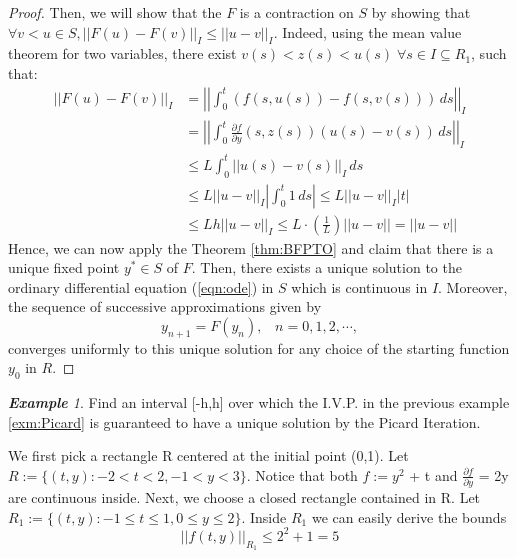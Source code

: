 \documentclass{article}
\theoremstyle{definition}
\theoremstyle{remark}
\theoremstyle{example}
\newtheorem{example}{\textbf{Example}}[section]
\begin{document}
\begin{proof}
    Then, we will show that the $F$ is a contraction on $S$ by showing that $\forall v < u \in S, \lvert\lvert F(u) - F(v) \rvert\rvert_I \leq \lvert\lvert u - v \rvert\rvert_I$. Indeed, using the mean value theorem for two variables, there exist $v(s) < z(s) < u(s) \; \forall s \in I \subseteq R_1$, such that:
    \begin{align}
        \lvert\lvert F(u) - F(v) \rvert\rvert_I & = \left\lvert\left\lvert \int_{0}^{t}{(f(s,u(s)) - f(s,v(s))) \,ds} \right\rvert\right\rvert_I\\
        & = \left\lvert\left\lvert \int_{0}^{t}\tfrac{\partial f}{\partial y}(s,z(s)){(u(s) - v(s))} \,ds \right\rvert\right\rvert_I\\
        & \leq L\int_{0}^{t}{\lvert\lvert u(s) - v(s) \rvert\rvert_I \,ds}\\
        & \leq L\lvert\lvert u - v \rvert\rvert_{I} \left\lvert \int_{0}^{t}{1}\,ds \right\rvert \leq L\lvert\lvert u - v \rvert\rvert_{I}\lvert t \rvert\\
        & \leq Lh\lvert\lvert u - v \rvert\rvert_{I} \leq L \cdot(\tfrac{1}{L})\lvert\lvert u - v \rvert\rvert = \lvert\lvert u - v \rvert\rvert
    \end{align}
    Hence, we can now apply the Theorem \ref{thm:BFPTO} and claim that there is a unique fixed point $y^{*} \in S$ of $F$. Then, there exists a unique solution to the ordinary differential equation (\ref{eqn:ode}) in $S$ which is continuous in $I$. Moreover, the sequence of successive approximations given by
    \begin{equation}
       y_{n+1} = F(y_n), \; \; \; n = 0, 1, 2, \cdots,
    \end{equation}
    converges uniformly to this unique solution for any choice of the starting function $y_0$ in $R$.
\end{proof}
    
\begin{example}
    Find an interval [-h,h] over which the I.V.P. in the previous example \ref{exm:Picard} is guaranteed to have a unique solution by the Picard Iteration.
\end{example}
We first pick a rectangle R centered at the initial point (0,1). Let $R :=\{(t,y): -2 < t < 2, -1 < y < 3\}$. Notice that both $f:= y^2$ + t and $ \frac{\partial f}{\partial y}$ = 2y are continuous inside.
Next, we choose a closed rectangle contained in R. Let $R_1:=\{(t,y): -1 \leq t \leq 1, 0 \leq y \leq 2\}$. Inside $R_1$ we can easily derive the bounds
\begin{equation}
    \lvert\lvert f(t,y) \rvert\rvert_{R_1} \leq 2^2 + 1 = 5
\end{equation}
\end{document}
